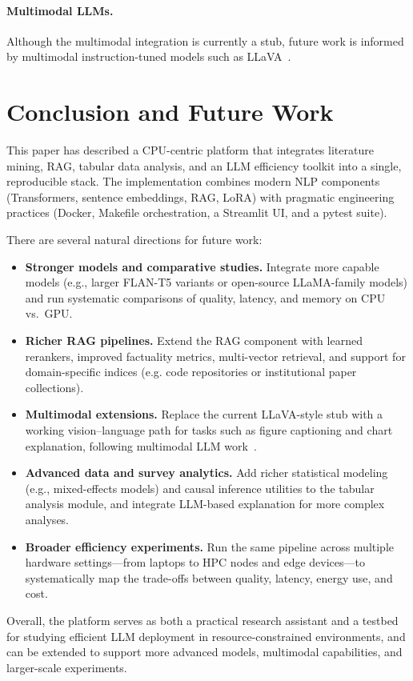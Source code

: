 \documentclass[11pt]{article}
\begin{document}
\paragraph{Multimodal LLMs.}
Although the multimodal integration is currently a stub, future work is informed by multimodal instruction-tuned models such as LLaVA~\citep{liu2023llava}.

\section{Conclusion and Future Work}

This paper has described a CPU-centric platform that integrates literature mining, RAG, tabular data analysis, and an LLM efficiency toolkit into a single, reproducible stack. The implementation combines modern NLP components (Transformers, sentence embeddings, RAG, LoRA) with pragmatic engineering practices (Docker, Makefile orchestration, a Streamlit UI, and a pytest suite).

There are several natural directions for future work:

\begin{itemize}[leftmargin=1.5em]
\item \textbf{Stronger models and comparative studies.} Integrate more capable models (e.g., larger FLAN-T5 variants or open-source LLaMA-family models) and run systematic comparisons of quality, latency, and memory on CPU vs.\ GPU.
\item \textbf{Richer RAG pipelines.} Extend the RAG component with learned rerankers, improved factuality metrics, multi-vector retrieval, and support for domain-specific indices (e.g. code repositories or institutional paper collections).
\item \textbf{Multimodal extensions.} Replace the current LLaVA-style stub with a working vision--language path for tasks such as figure captioning and chart explanation, following multimodal LLM work~\citep{liu2023llava}.
\item \textbf{Advanced data and survey analytics.} Add richer statistical modeling (e.g., mixed-effects models) and causal inference utilities to the tabular analysis module, and integrate LLM-based explanation for more complex analyses.
\item \textbf{Broader efficiency experiments.} Run the same pipeline across multiple hardware settings---from laptops to HPC nodes and edge devices---to systematically map the trade-offs between quality, latency, energy use, and cost.
\end{itemize}

Overall, the platform serves as both a practical research assistant and a testbed for studying efficient LLM deployment in resource-constrained environments, and can be extended to support more advanced models, multimodal capabilities, and larger-scale experiments.



\end{document}
